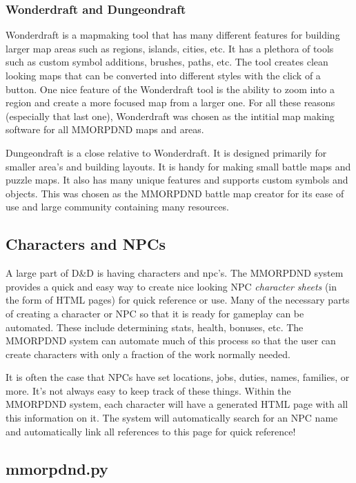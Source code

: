\subsubsection{Wonderdraft and Dungeondraft}

Wonderdraft is a mapmaking tool that has many different features for building larger map areas such as regions, islands, cities, etc. It has a plethora of tools such as custom symbol additions, brushes, paths, etc. The tool creates clean looking maps that can be converted into different styles with the click of a button. One nice feature of the Wonderdraft tool is the ability to zoom into a region and create a more focused map from a larger one. For all these reasons (especially that last one), Wonderdraft was chosen as the intitial map making software for all MMORPDND maps and areas.

Dungeondraft is a close relative to Wonderdraft. It is designed primarily for smaller area's and building layouts. It is handy for making small battle maps and puzzle maps. It also has many unique features and supports custom symbols and objects. This was chosen as the MMORPDND battle map creator for its ease of use and large community containing many resources.

\subsection{Characters and NPCs}

A large part of D\&D is having characters and npc's. The MMORPDND system provides a quick and easy way to create nice looking NPC \textit{character sheets} (in the form of HTML pages) for quick reference or use. Many of the necessary parts of creating a character or NPC so that it is ready for gameplay can be automated. These include determining stats, health, bonuses, etc. The MMORPDND system can automate much of this process so that the user can create characters with only a fraction of the work normally needed.

It is often the case that NPCs have set locations, jobs, duties, names, families, or more. It's not always easy to keep track of these things. Within the MMORPDND system, each character will have a generated HTML page with all this information on it. The system will automatically search for an NPC name and automatically link all references to this page for quick reference!

\subsection{mmorpdnd.py}

